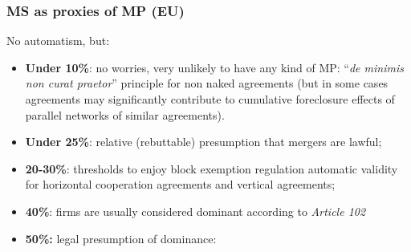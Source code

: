         \subsubsection{MS as proxies of MP (EU)}

            No automatism, but:
                \begin{itemize}
                    \item \textbf{Under 10\%}: no worries, very unlikely to have any kind of MP: “\textit{de minimis non curat praetor}” principle for non naked agreements (but in some cases agreements may significantly contribute to cumulative foreclosure effects of parallel networks of similar agreements).
                    \item \textbf{Under 25\%}: relative (rebuttable) presumption that mergers are lawful;
                    \item \textbf{20-30\%}: thresholds to enjoy block exemption regulation automatic validity for horizontal cooperation agreements and vertical agreements;
                    \item \textbf{40\%}: firms are usually considered dominant according to \textit{Article 102}
                    \item \textbf{50\%:} legal presumption of dominance:
                        
                \end{itemize}